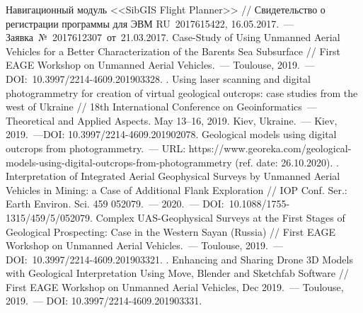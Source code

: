 \begin{thebibliography}{99}

\bibitem{} Навигационный модуль <<SibGIS Flight Planner>> // Свидетельство о регистрации программы для ЭВМ RU~2017615422, 16.05.2017.~--- Заявка №~2017612307 от 21.03.2017.
\bibitem{} Case-Study of Using Unmanned Aerial Vehicles for a Better Characterization of the Barents Sea Subsurface // First EAGE Workshop on Unmanned Aerial Vehicles.~--- Toulouse, 2019.~--- DOI:~10.3997/2214-4609.201903328.
\bibitem{}. Using laser scanning and digital photogrammetry for creation of virtual geological outcrops: case studies from the west of Ukraine // 18th International Conference on Geoinformatics~--- Theoretical and Applied Aspects. May 13--16, 2019. Kiev, Ukraine.~--- Kiev, 2019.~---DOI: 10.3997/2214-4609.201902078.
\bibitem{}Geological models using digital outcrops from photogrammetry.~--- URL: https://www.georeka.com/geological\--models\--using\--digital\--outcrops\--from\--photogrammetry (ref. date: 26.10.2020).
\bibitem{}. Interpretation of Integrated Aerial Geophysical Surveys by Unmanned Aerial Vehicles in Mining: a Case of Additional Flank Exploration // IOP Conf. Ser.: Earth Environ. Sci. 459 052079.~--- 2020.~--- DOI:~10.1088/1755-1315/459/5/052079.
\bibitem{} Complex UAS-Geophysical Surveys at the First Stages of Geological Prospecting: Case in the Western Sayan (Russia) // First EAGE Workshop on Unmanned Aerial Vehicles.~--- Toulouse, 2019.~--- DOI:~10.3997/2214-4609.201903321.
\bibitem{}. Enhancing and Sharing Drone 3D Models with Geological Interpretation Using Move, Blender and Sketchfab Software // First EAGE Workshop on Unmanned Aerial Vehicles, Dec 2019.~--- Toulouse, 2019.~--- DOI: 10.3997/2214-4609.201903331.
\end{thebibliography}
